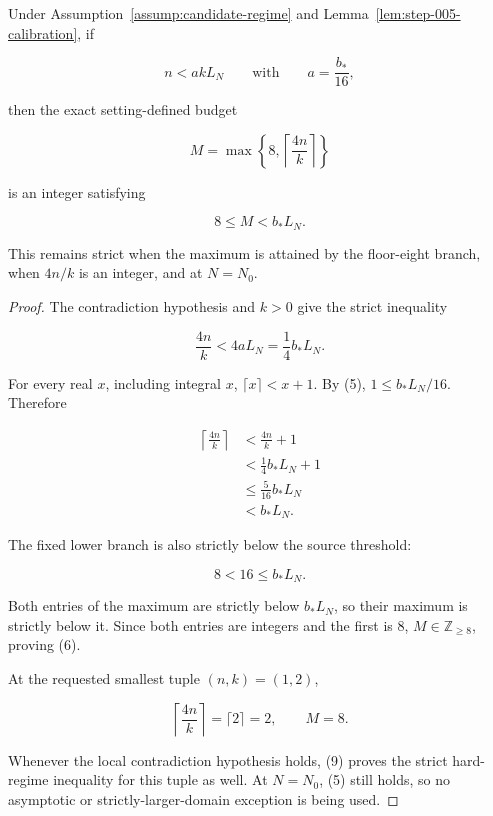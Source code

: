 \begin{lemma}\label{lem:step-005-budget}
Under Assumption~\ref{assump:candidate-regime} and
Lemma~\ref{lem:step-005-calibration}, if

\[
n<akL_N
\qquad\text{with}\qquad a=\frac{b_*}{16},
\]

then the exact setting-defined budget

\[
M=\max\left\{8,\left\lceil\frac{4n}{k}\right\rceil\right\}
\]

is an integer satisfying

\[
8\le M<b_*L_N.
\tag{6}
\]

This remains strict when the maximum is attained by the floor-eight
branch, when \(4n/k\) is an integer, and at \(N=N_0\).
\end{lemma}

\begin{proof}
The contradiction hypothesis and \(k>0\) give the strict inequality

\[
\frac{4n}{k}
<4aL_N
=\frac14 b_*L_N.
\tag{7}
\]

For every real \(x\), including integral \(x\),
\(\lceil x\rceil<x+1\). By (5), \(1\le b_*L_N/16\). Therefore

\[
\begin{aligned}
\left\lceil\frac{4n}{k}\right\rceil
&<\frac{4n}{k}+1\\
&<\frac14b_*L_N+1\\
&\le\frac{5}{16}b_*L_N\\
&<b_*L_N.
\end{aligned}
\tag{8}
\]

The fixed lower branch is also strictly below the source threshold:

\[
8<16\le b_*L_N.
\tag{9}
\]

Both entries of the maximum are strictly below \(b_*L_N\), so their
maximum is strictly below it. Since both entries are integers and the first
is 8, \(M\in\mathbb Z_{\ge8}\), proving (6).

At the requested smallest tuple \((n,k)=(1,2)\),

\[
\left\lceil\frac{4n}{k}\right\rceil=\lceil2\rceil=2,
\qquad M=8.
\]

Whenever the local contradiction hypothesis holds, (9) proves the strict
hard-regime inequality for this tuple as well. At \(N=N_0\), (5) still
holds, so no asymptotic or strictly-larger-domain exception is being used.
\end{proof}

